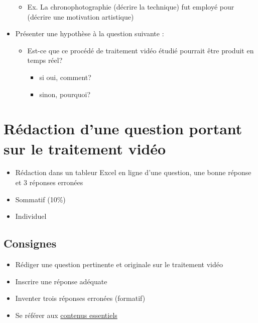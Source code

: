 \documentclass[
]{book}
\providecommand{\tightlist}{%
  \setlength{\itemsep}{0pt}\setlength{\parskip}{0pt}}
\begin{document}
\begin{itemize}
  \begin{itemize}
  \tightlist
  \item
    Ex. La chronophotographie (décrire la technique) fut employé pour (décrire une motivation artistique)
  \end{itemize}
\item
  Présenter une hypothèse à la question suivante :

  \begin{itemize}
  \tightlist
  \item
    Est-ce que ce procédé de traitement vidéo étudié pourrait être produit en temps réel?

    \begin{itemize}
    \tightlist
    \item
      si oui, comment?
    \item
      sinon, pourquoi?
    \end{itemize}
  \end{itemize}
\end{itemize}

\hypertarget{sommatif_2}{%
\section{Rédaction d'une question portant sur le traitement vidéo}\label{sommatif_2}}

\begin{itemize}
\tightlist
\item
  Rédaction dans un tableur Excel en ligne d'une question, une bonne réponse et 3 réponses erronées\\
\item
  Sommatif (10\%)
\item
  Individuel
\end{itemize}

\hypertarget{consignes-1}{%
\subsection{Consignes}\label{consignes-1}}

\begin{itemize}
\tightlist
\item
  Rédiger une question pertinente et originale sur le traitement vidéo
\item
  Inscrire une réponse adéquate
\item
  Inventer trois réponses erronées (formatif)
\item
  Se référer aux \href{}{contenus essentiels}
\end{itemize}
\end{document}
